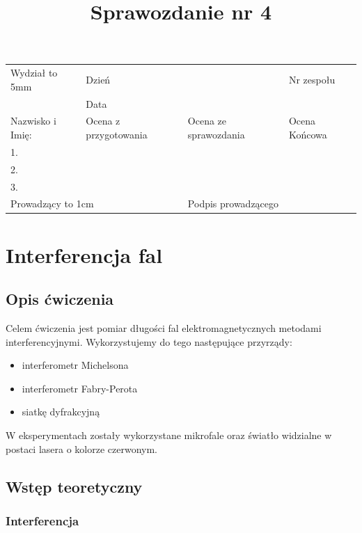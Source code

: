 \documentclass[a4paper]{article}
\title{Sprawozdanie nr 4}
\date{}
\newcommand{\Vsp}[1]{\vtop to #1 {}}
\newcommand{\Small}{\scriptsize}
\begin{document}
\begin{center}
\begin{tabular}{|p{5cm}|l|l|l|}
    \hline
    Wydział \Vsp{5mm} & \multicolumn{1}{|l}{Dzień} &  & Nr zespołu\\
    & \multicolumn{1}{|l}{Data} &  & \\
    \hline 
    Nazwisko i Imię: & \Small Ocena z przygotowania  & \Small Ocena ze sprawozdania & \Small Ocena Końcowa \\
    1. & & &\\
    2. & & & \\
    3. & & & \\
    \hline
    \multicolumn{2}{|l|}{Prowadzący \Vsp{1cm}} & \multicolumn{2}{|l|}{Podpis prowadzącego} \\
    \hline
\end{tabular}
\end{center}

{\let\newpage\relax\maketitle}
\setcounter{secnumdepth}{2}
\setcounter{tocdepth}{2}

\section{Interferencja fal} %

\subsection{Opis ćwiczenia}

Celem ćwiczenia jest pomiar długości fal elektromagnetycznych metodami interferencyjnymi.
Wykorzystujemy do tego następujące przyrządy:
\begin{itemize}
\item interferometr Michelsona
\item interferometr Fabry-Perota
\item siatkę dyfrakcyjną
\end{itemize}
W eksperymentach zostały wykorzystane mikrofale oraz światło widzialne w postaci lasera o kolorze czerwonym.

\subsection{Wstęp teoretyczny}

\subsubsection{Interferencja}
\end{document}
